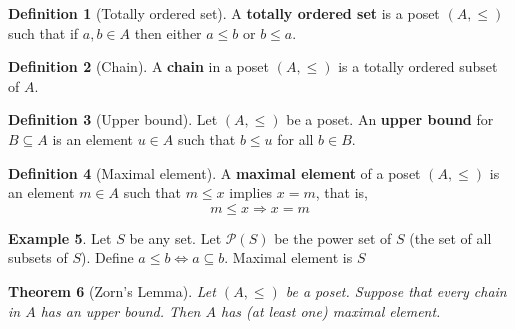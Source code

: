 \documentclass[10pt, reqno, oneside]{amsart}
\theoremstyle{plain}%
\newtheorem{thm}{Theorem}[section]
\theoremstyle{definition}
\newtheorem{defn}[thm]{Definition}
\newtheorem{exmp}[thm]{Example}
\theoremstyle{remark}
\begin{document}
\begin{defn}[Totally ordered set]
	A \textbf{totally ordered set} is a poset $(A, \leq)$ such that if $a, b \in A$ then either $a \leq b$ or $b \leq a$.
\end{defn}

\begin{defn}[Chain]
	A \textbf{chain} in a poset $(A, \leq)$ is a totally ordered subset of $A$.
\end{defn}

\begin{defn}[Upper bound]
	Let $(A, \leq)$ be a poset.  An \textbf{upper bound} for $B \subseteq A$ is an element $u \in A$ such that $b \leq u$ for all $ b \in B$.  
\end{defn}

\begin{defn}[Maximal element]
	A \textbf{maximal element} of a poset $(A, \leq)$ is an element $m \in A$ such that $m \leq x$ implies $x = m$, that is, \[
		m \leq x \Rightarrow x = m
	\]
\end{defn}

\begin{exmp}
	Let $S$ be any set.  Let $\mathcal{P}(S)$ be the power set of $S$ (the set of all subsets of $S$).  Define $a \leq b \iff a \subseteq b$.  Maximal element is $S$
\end{exmp}

\begin{thm}[Zorn's Lemma]
	Let $(A, \leq)$ be a poset.  Suppose that every chain in $A$ has an upper bound.  Then $A$ has (at least one) maximal element.  
\end{thm}
\end{document}
